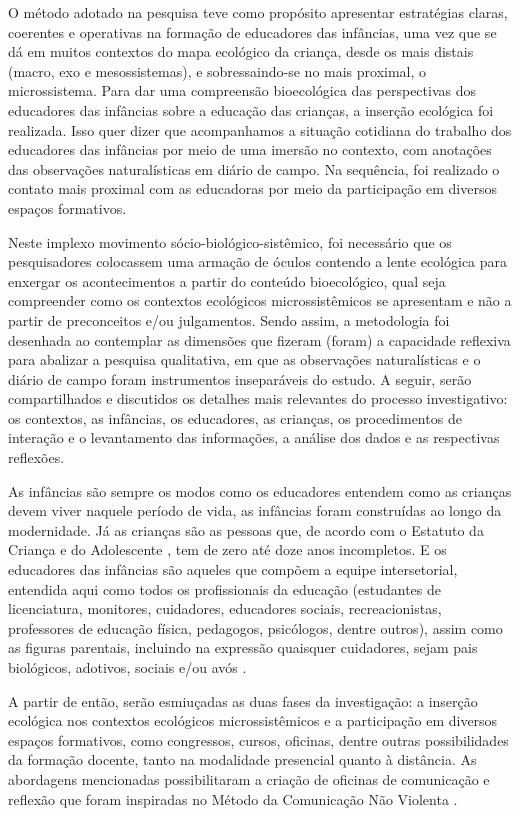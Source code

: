 \documentclass{textolivre-html}
\begin{document}
O método adotado na pesquisa teve como propósito apresentar estratégias claras, coerentes e operativas na formação de educadores das infâncias, uma vez que se dá em muitos contextos do mapa ecológico da criança, desde os mais distais (macro, exo e mesossistemas), e sobressaindo-se no mais proximal, o microssistema. Para dar uma compreensão bioecológica das perspectivas dos educadores das infâncias sobre a educação das crianças, a inserção ecológica foi realizada. Isso quer dizer que acompanhamos a situação cotidiana do trabalho dos educadores das infâncias por meio de uma imersão no contexto, com anotações das observações naturalísticas em diário de campo. Na sequência, foi realizado o contato mais proximal com as educadoras por meio da participação em diversos espaços formativos.  

Neste implexo movimento sócio-biológico-sistêmico, foi necessário que os pesquisadores colocassem uma armação de óculos contendo a lente ecológica para enxergar os acontecimentos a partir do conteúdo bioecológico, qual seja compreender como os contextos ecológicos microssistêmicos se apresentam e não a partir de preconceitos e/ou julgamentos. Sendo assim, a metodologia foi desenhada ao contemplar as dimensões que fizeram (foram) a capacidade reflexiva para abalizar a pesquisa qualitativa, em que as observações naturalísticas e o diário de campo foram instrumentos inseparáveis do estudo. A seguir, serão compartilhados e discutidos os detalhes mais relevantes do processo investigativo: os contextos, as infâncias, os educadores, as crianças, os procedimentos de interação e o levantamento das informações, a análise dos dados e as respectivas reflexões.

As infâncias são sempre os modos como os educadores entendem como as crianças devem viver naquele período de vida, as infâncias foram construídas ao longo da modernidade. Já as crianças são as pessoas que, de acordo com o Estatuto da Criança e do Adolescente \cite{eca1990}, tem de zero até doze anos incompletos. E os educadores das infâncias são aqueles que compõem a equipe intersetorial, entendida aqui como todos os profissionais da educação (estudantes de licenciatura, monitores, cuidadores, educadores sociais, recreacionistas, professores de educação física, pedagogos, psicólogos, dentre outros), assim como as figuras parentais, incluindo na expressão quaisquer cuidadores, sejam pais biológicos, adotivos, sociais e/ou avós \cite{piske2019}.

A partir de então, serão esmiuçadas as duas fases da investigação: a inserção ecológica nos contextos ecológicos microssistêmicos \cite{piske2018c,koller2016,silveira2009} e a participação em diversos espaços formativos, como congressos, cursos, oficinas, dentre outras possibilidades da formação docente, tanto na modalidade presencial quanto à distância. As abordagens mencionadas possibilitaram a criação de oficinas de comunicação e reflexão que foram inspiradas no Método da Comunicação Não Violenta \cite{rosenberg2006}. 
\end{document}
